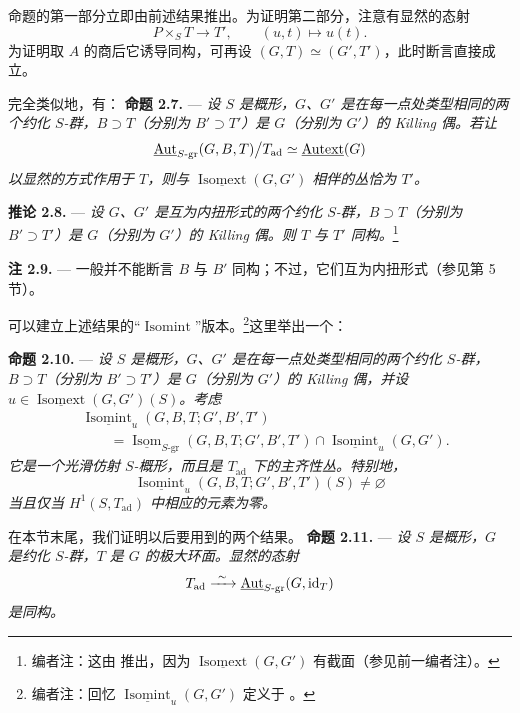 命题的第一部分立即由前述结果推出。为证明第二部分，注意有显然的态射
\[
  P\times_S T\longrightarrow T',
  \qquad (u,t)\longmapsto u(t).
\]
为证明取 \(A\) 的商后它诱导同构，可再设 \((G,T)\simeq(G',T')\)，此时断言直接成立。

完全类似地，有：
\medskip\noindent\textbf{命题 2.7.} ---
{\itshape 设 \(S\) 是概形，\(G\)、\(G'\) 是在每一点处类型相同的两个约化 \(S\)-群，\(B\supset T\)（分别为 \(B'\supset T'\)）是 \(G\)（分别为 \(G'\)）的 Killing 偶。若让
\[
  \underline{\operatorname{Aut}}_{S\text{-}\mathrm{gr}}(G,B,T)
  \big/T_{\mathrm{ad}}
  \simeq \underline{\operatorname{Autext}}(G)
\]
以显然的方式作用于 \(T\)，则与 \(\underline{\operatorname{Isomext}}(G,G')\) 相伴的丛恰为 \(T'\)。}

\medskip\noindent\textbf{推论 2.8.} ---
{\itshape 设 \(G\)、\(G'\) 是互为内扭形式的两个约化 \(S\)-群，\(B\supset T\)（分别为 \(B'\supset T'\)）是 \(G\)（分别为 \(G'\)）的 Killing 偶。则 \(T\) 与 \(T'\) 同构。}\footnote{编者注：这由  推出，因为 \(\underline{\operatorname{Isomext}}(G,G')\) 有截面（参见前一编者注）。}

\medskip\noindent\textbf{注 2.9.} ---
一般并不能断言 \(B\) 与 \(B'\) 同构；不过，它们互为内扭形式（参见第 5 节）。

可以建立上述结果的“\(\operatorname{Isomint}\)”版本。\footnote{编者注：回忆 \(\underline{\operatorname{Isomint}}_u(G,G')\) 定义于 。}这里举出一个：

\medskip\noindent\textbf{命题 2.10.} ---
{\itshape 设 \(S\) 是概形，\(G\)、\(G'\) 是在每一点处类型相同的两个约化 \(S\)-群，\(B\supset T\)（分别为 \(B'\supset T'\)）是 \(G\)（分别为 \(G'\)）的 Killing 偶，并设 \(u\in\underline{\operatorname{Isomext}}(G,G')(S)\)。考虑}
\[
\begin{aligned}
  &\underline{\operatorname{Isomint}}_u
     (G,B,T;G',B',T')\\
  &\qquad =
  \underline{\operatorname{Isom}}_{S\text{-}\mathrm{gr}}
     (G,B,T;G',B',T')
  \cap
  \underline{\operatorname{Isomint}}_u(G,G').
\end{aligned}
\]
{\itshape 它是一个光滑仿射 \(S\)-概形，而且是 \(T_{\mathrm{ad}}\) 下的主齐性丛。特别地，}
\[
  \underline{\operatorname{Isomint}}_u
    (G,B,T;G',B',T')(S)\ne\varnothing
\]
{\itshape 当且仅当 \(H^1(S,T_{\mathrm{ad}})\) 中相应的元素为零。}

在本节末尾，我们证明以后要用到的两个结果。
\medskip\noindent\textbf{命题 2.11.} ---
{\itshape 设 \(S\) 是概形，\(G\) 是约化 \(S\)-群，\(T\) 是 \(G\) 的极大环面。显然的态射}
\[
  T_{\mathrm{ad}}
  \xrightarrow{\ \sim\ }
  \underline{\operatorname{Aut}}_{S\text{-}\mathrm{gr}}(G,\operatorname{id}_T)
\]
{\itshape 是同构。}

